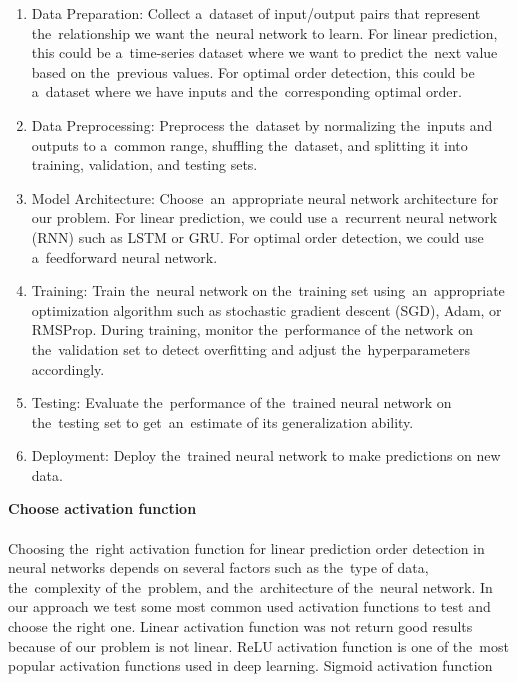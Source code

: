         \begin{enumerate}
            \item Data Preparation: Collect a~dataset of input/output pairs that represent the~relationship we want
            the~neural network to learn. For linear prediction, this could be a~time-series dataset where we want to
            predict the~next value based on the~previous values. For optimal order detection, this could be a~dataset
            where we have inputs and the~corresponding optimal order.
            \item Data Preprocessing: Preprocess the~dataset by normalizing the~inputs and outputs to a~common range,
            shuffling the~dataset, and splitting it into training, validation, and testing sets.
            \item Model Architecture: Choose~an~appropriate neural network architecture for our problem. For linear
            prediction, we could use a~recurrent neural network (RNN) such as LSTM or GRU. For optimal order
            detection, we could use a~feedforward neural network.
            \item Training: Train the~neural network on the~training set using~an~appropriate optimization algorithm
            such as stochastic gradient descent (SGD), Adam, or RMSProp. During training, monitor the~performance of the
            network on the~validation set to detect overfitting and adjust the~hyperparameters accordingly.
            \item Testing: Evaluate the~performance of the~trained neural network on the~testing set
            to get~an~estimate of its generalization ability.
            \item Deployment: Deploy the~trained neural network to make predictions on new data.
        \end{enumerate}
        \textbf{Choose activation function}\\
        \\
        Choosing the~right activation function for linear prediction order detection in neural networks depends on
        several factors such as the~type of data, the~complexity of the~problem, and the~architecture of the~neural
        network. In our approach we test some most common used activation functions to test and choose the right one.
        Linear activation function was not return good results because of our problem is not linear. ReLU activation function is one of the~most popular activation functions used in deep learning. Sigmoid activation function

